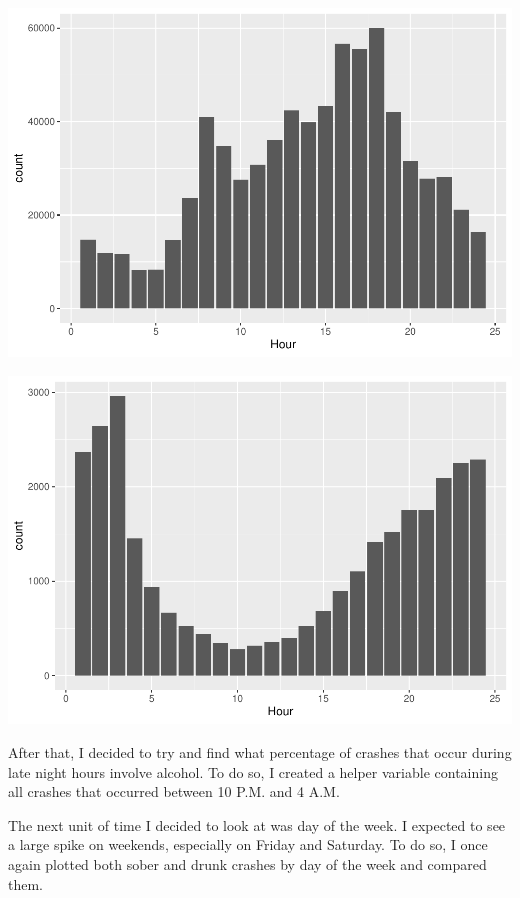 \documentclass[conference,final,]{IEEEtran}
\begin{document}
\begin{center}\includegraphics[width=0.9\columnwidth]{CAUSE_files/figure-latex/unnamed-chunk-11-1} \end{center}

\begin{center}\includegraphics[width=0.9\columnwidth]{CAUSE_files/figure-latex/unnamed-chunk-11-2} \end{center}

After that, I decided to try and find what percentage of crashes that occur during late night hours involve alcohol. To do so, I created a helper variable containing all crashes that occurred between 10 P.M. and 4 A.M.

The next unit of time I decided to look at was day of the week. I expected to see a large spike on weekends, especially on Friday and Saturday. To do so, I once again plotted both sober and drunk crashes by day of the week and compared them.
\end{document}

